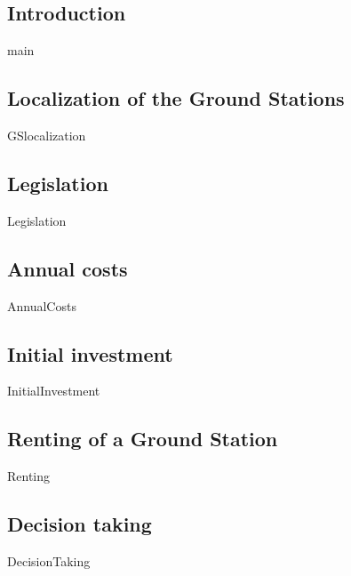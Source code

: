 \subsection{Introduction}
{main}

\subsection{Localization of the Ground Stations}
{GSlocalization}

\subsection{Legislation}
{Legislation}

\subsection{Annual costs}
{AnnualCosts}

\subsection{Initial investment}
{InitialInvestment}

\subsection{Renting of a Ground Station}
{Renting}

\subsection{Decision taking}
{DecisionTaking}